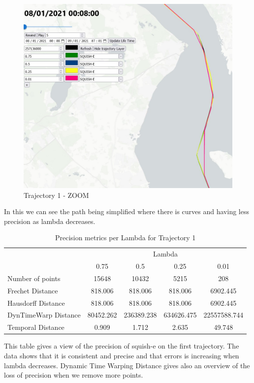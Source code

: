 \begin{figure}[!h]
    \centering
    \includegraphics[width=0.5\linewidth]{figures/Stats/squish_1_zoom.jpg}
    \caption{Trajectory 1 - ZOOM }
    \label{fig:traj_1_sqzoom}
\end{figure}

In this we can see the path being simplified where there is curves and having less precision as lambda decreases.

\begin{table}[htbp]
    \centering
    \label{tab:precision_metrics}
    \begin{tabular}{@{}lcccc@{}}
        \toprule
        & \multicolumn{4}{c}{Lambda} \\
        \cmidrule{2-5}
        & 0.75       & 0.5        & 0.25       & 0.01       \\
        \midrule
        Number of points           & 15648 & 10432 & 5215 & 208 \\
        Frechet Distance              & 818.006 & 818.006 & 818.006 & 6902.445 \\
        Hausdorff Distance             & 818.006 & 818.006 & 818.006 & 6902.445 \\
        DynTimeWarp Distance            & 80452.262 &  236389.238 & 634626.475 & 22557588.744\\
        Temporal Distance            & 0.909 & 1.712 & 2.635 & 49.748\\
        \bottomrule
    \end{tabular}
    \caption{Precision metrics per Lambda for Trajectory 1 }
\end{table}

This table gives a view of the precision of squish-e on the first trajectory. The data shows that it is consistent and precise and that errors is increasing when lambda decreases. Dynamic Time Warping Distance gives also an overview of the loss of precision when we remove more points.

